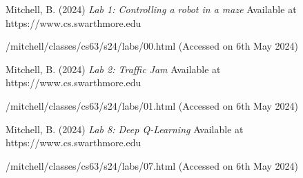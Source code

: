 \documentclass[11pt]{article}
\begin{document}
\noindent

Mitchell, B. (2024) \textit{Lab 1: Controlling a robot in a maze} Available at https://www.cs.swarthmore.edu

/mitchell/classes/cs63/s24/labs/00.html (Accessed on 6th May 2024)


Mitchell, B. (2024) \textit{Lab 2:  Traffic Jam} Available at https://www.cs.swarthmore.edu

/mitchell/classes/cs63/s24/labs/01.html (Accessed on 6th May 2024)


Mitchell, B. (2024) \textit{Lab 8: Deep Q-Learning} Available at https://www.cs.swarthmore.edu

/mitchell/classes/cs63/s24/labs/07.html (Accessed on 6th May 2024)

\end{document}
